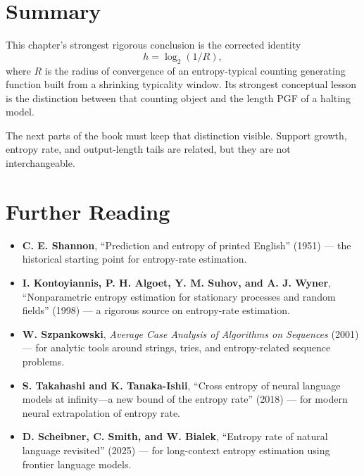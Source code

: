 \section*{Summary}

This chapter's strongest rigorous conclusion is the corrected identity
\[
  h = \log_2(1/R),
\]
where $R$ is the radius of convergence of an entropy-typical counting generating function built from a shrinking typicality window. Its strongest conceptual lesson is the distinction between that counting object and the length PGF of a halting model.

The next parts of the book must keep that distinction visible. Support growth, entropy rate, and output-length tails are related, but they are not interchangeable.

\section*{Further Reading}

\begin{itemize}
  \item \textbf{C. E. Shannon}, ``Prediction and entropy of printed English'' (1951) \cite{Shannon1951} --- the historical starting point for entropy-rate estimation.
  \item \textbf{I. Kontoyiannis, P. H. Algoet, Y. M. Suhov, and A. J. Wyner}, ``Nonparametric entropy estimation for stationary processes and random fields'' (1998) \cite{KontoyiannisEtAl1998} --- a rigorous source on entropy-rate estimation.
  \item \textbf{W. Szpankowski}, \emph{Average Case Analysis of Algorithms on Sequences} (2001) \cite{Szpankowski2001} --- for analytic tools around strings, tries, and entropy-related sequence problems.
  \item \textbf{S. Takahashi and K. Tanaka-Ishii}, ``Cross entropy of neural language models at infinity---a new bound of the entropy rate'' (2018) \cite{TakahashiTanakaIshii2018} --- for modern neural extrapolation of entropy rate.
  \item \textbf{D. Scheibner, C. Smith, and W. Bialek}, ``Entropy rate of natural language revisited'' (2025) \cite{ScheibnerSmithBialek2025} --- for long-context entropy estimation using frontier language models.
\end{itemize}
